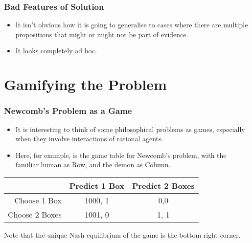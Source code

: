 \begin{frame}

\frametitle{Bad Features of Solution}
\label{badfeaturesofsolution}

\begin{itemize}
\item It isn't obvious how it is going to generalise to cases where there are multiple propositions that might or might not be part of evidence. \pause

\item It looks completely ad hoc.

\end{itemize}
\end{frame}

\section{Gamifying the Problem}
\label{gamifyingtheproblem}

\begin{frame}

\frametitle{Newcomb's Problem as a Game}
\label{newcombsproblemasagame}

\begin{itemize}
\item It is interesting to think of some philosophical problems as games, especially when they involve interactions of rational agents.

\item Here, for example, is the game table for Newcomb's problem, with the familiar human as Row, and the demon as Column.

\end{itemize}

\begin{center}
\begin{tabular}{r | c c}
 & Predict 1 Box & Predict 2 Boxes \\ \hline
Choose 1 Box & 1000, 1 & 0,0 \\
Choose 2 Boxes & 1001, 0 & 1, 1
\end{tabular}
\end{center}
\pause


Note that the unique Nash equilibrium of the game is the bottom right corner.

\end{frame}

